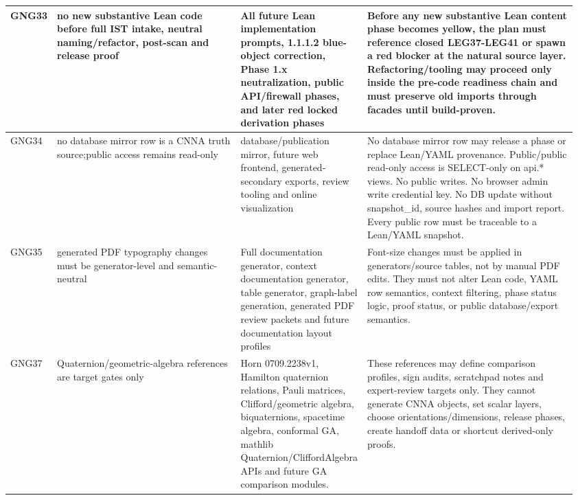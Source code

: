 \begin{longtable}{L{0.045\linewidth} L{0.345\linewidth} L{0.185\linewidth} L{0.39\linewidth}}
\hline
\addlinespace[0.24em]
GNG33 & no new substantive Lean code before full IST intake, neutral naming/\allowbreak{}refactor, post-scan and release proof & All future Lean implementation prompts, 1.1.1.2 blue-object correction, Phase 1.x neutralization, public API/\allowbreak{}firewall phases, and later red locked derivation phases & Before any new substantive Lean content phase becomes yellow, the plan must reference closed LEG37-LEG41 or spawn a red blocker at the natural source layer. Refactoring/\allowbreak{}tooling may proceed only inside the pre-code readiness chain and must preserve old imports through facades until build-proven.\\
\hline
\addlinespace[0.24em]
GNG34 & no database mirror row is a CNNA truth source;\newline public access remains read-only & database/\allowbreak{}publication mirror, future web frontend, generated-secondary exports, review tooling and online visualization & No database mirror row may release a phase or replace Lean/\allowbreak{}YAML provenance. Public/\allowbreak{}public read-only access is SELECT-only on api.* views. No public writes. No browser admin write credential key. No DB update without snapshot\_id, source hashes and import report. Every public row must be traceable to a Lean/\allowbreak{}YAML snapshot.\\
\hline
\addlinespace[0.24em]
GNG35 & generated PDF typography changes must be generator-level and semantic-neutral & Full documentation generator, context documentation generator, table generator, graph-label generation, generated PDF review packets and future documentation layout profiles & Font-size changes must be applied in generators/\allowbreak{}source tables, not by manual PDF edits. They must not alter Lean code, YAML row semantics, context filtering, phase status logic, proof status, or public database/\allowbreak{}export semantics.\\
\hline
\addlinespace[0.24em]
GNG37 & Quaternion/\allowbreak{}geometric-algebra references are target gates only & Horn 0709.2238v1, Hamilton quaternion relations, Pauli matrices, Clifford/\allowbreak{}geometric algebra, biquaternions, spacetime algebra, conformal GA, mathlib Quaternion/\allowbreak{}CliffordAlgebra APIs and future GA comparison modules. & These references may define comparison profiles, sign audits, scratchpad notes and expert-review targets only. They cannot generate CNNA objects, set scalar layers, choose orientations/\allowbreak{}dimensions, release phases, create handoff data or shortcut derived-only proofs.\\

\end{longtable}
